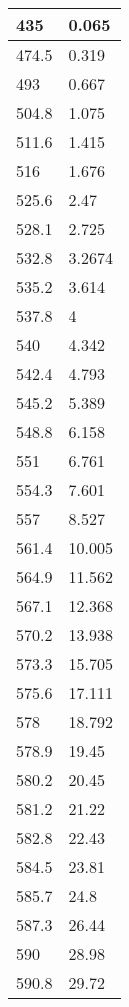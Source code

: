 \begin{tabular}{|l|l|}
\hline
435&0.065\\\hline
474.5&0.319\\\hline
493&0.667\\\hline
504.8&1.075\\\hline
511.6&1.415\\\hline
516&1.676\\\hline
525.6&2.47\\\hline
528.1&2.725\\\hline
532.8&3.2674\\\hline
535.2&3.614\\\hline
537.8&4\\\hline
540&4.342\\\hline
542.4&4.793\\\hline
545.2&5.389\\\hline
548.8&6.158\\\hline
551&6.761\\\hline
554.3&7.601\\\hline
557&8.527\\\hline
561.4&10.005\\\hline
564.9&11.562\\\hline
567.1&12.368\\\hline
570.2&13.938\\\hline
573.3&15.705\\\hline
575.6&17.111\\\hline
578&18.792\\\hline
578.9&19.45\\\hline
580.2&20.45\\\hline
581.2&21.22\\\hline
582.8&22.43\\\hline
584.5&23.81\\\hline
585.7&24.8\\\hline
587.3&26.44\\\hline
590&28.98\\\hline
590.8&29.72\\\hline
\end{tabular}
